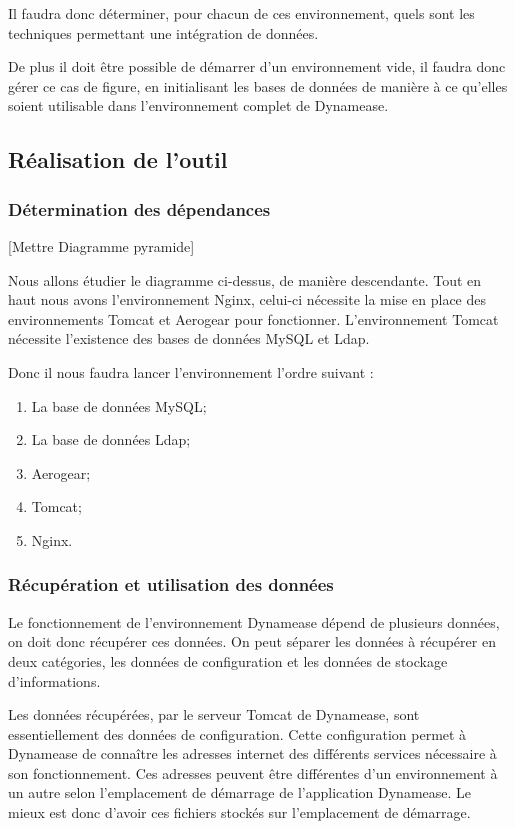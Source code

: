 Il faudra donc déterminer, pour chacun de ces environnement, quels sont les techniques permettant une intégration de données.

De plus il doit être possible de démarrer d'un environnement vide, il faudra donc gérer ce cas de figure, en initialisant les bases de données de manière à ce qu'elles soient utilisable dans l'environnement complet de Dynamease.

\subsection{Réalisation de l'outil}

\subsubsection{Détermination des dépendances}

[Mettre Diagramme pyramide]

Nous allons étudier le diagramme ci-dessus, de manière descendante. Tout en haut nous avons l'environnement Nginx, celui-ci nécessite la mise en place des environnements Tomcat et Aerogear pour fonctionner. L'environnement Tomcat nécessite l'existence des bases de données MySQL et Ldap. 

Donc il nous faudra lancer l'environnement l'ordre suivant :

\begin{enumerate}
	\item La base de données MySQL;
	\item La base de données Ldap;
	\item Aerogear;
	\item Tomcat;
	\item Nginx.
\end{enumerate}

\subsubsection{Récupération et utilisation des données}

Le fonctionnement de l'environnement Dynamease dépend de plusieurs données, on doit donc récupérer ces données. On peut séparer les données à récupérer en deux catégories, les données de configuration et les données de stockage d'informations.

Les données récupérées, par le serveur Tomcat de Dynamease, sont essentiellement des données de configuration. Cette configuration permet à Dynamease de connaître les adresses internet des différents services nécessaire à son fonctionnement. Ces adresses peuvent être différentes d'un environnement à un autre selon l'emplacement de démarrage de l'application Dynamease. Le mieux est donc d'avoir ces fichiers stockés sur l'emplacement de démarrage.

